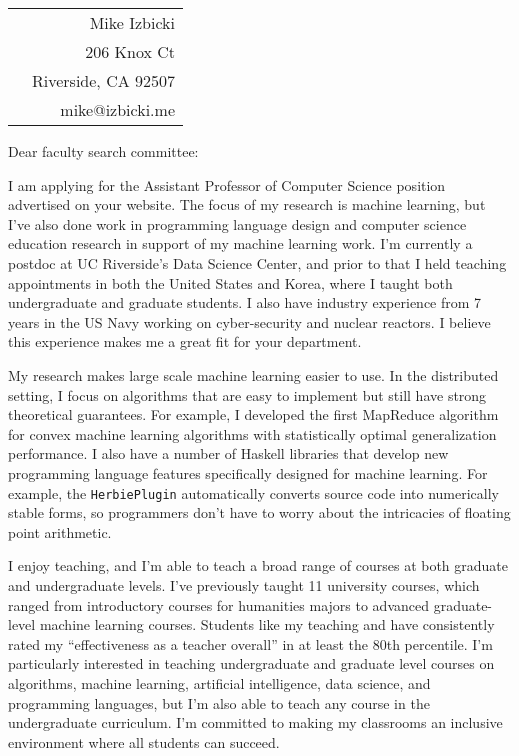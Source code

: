 \documentclass[12pt]{article}
\begin{document}
\noindent
\hspace{-0.13in}
\begin{tabularx}{1.03\textwidth}{Xr}
 & Mike Izbicki \\
 & 206 Knox Ct\\
 & Riverside, CA 92507\\
 & mike@izbicki.me\\
\end{tabularx}

\vspace{0.2in}

\setlength{\parskip}{15pt plus4mm minus3mm}

\noindent
Dear faculty search committee:

\noindent
I am applying for the Assistant Professor of Computer Science position advertised on your website.
The focus of my research is machine learning,
but I've also done work in programming language design and computer science education research in support of my machine learning work.
I'm currently a postdoc at UC Riverside's Data Science Center,
and prior to that I held teaching appointments in both the United States and Korea, where I taught both undergraduate and graduate students.
I also have industry experience from 7 years in the US Navy working on cyber-security and nuclear reactors.
I believe this experience makes me a great fit for your department.

\noindent
My research makes large scale machine learning easier to use.
In the distributed setting, I focus on algorithms that are easy to implement but still have strong theoretical guarantees.
For example, I developed the first MapReduce algorithm for convex machine learning algorithms with statistically optimal generalization performance.
I also have a number of Haskell libraries that develop new programming language features specifically designed for machine learning.
For example, the \texttt{HerbiePlugin} automatically converts source code into numerically stable forms,
so programmers don't have to worry about the intricacies of floating point arithmetic.

\noindent
I enjoy teaching,
and I'm able to teach a broad range of courses at both graduate and undergraduate levels.
I've previously taught 11 university courses,
which ranged from introductory courses for humanities majors to advanced graduate-level machine learning courses.
Students like my teaching and have consistently rated my ``effectiveness as a teacher overall'' in at least the 80th percentile.
I'm particularly interested in teaching undergraduate and graduate level courses on algorithms, machine learning, artificial intelligence, data science, and programming languages,
but I'm also able to teach any course in the undergraduate curriculum.
I'm committed to making my classrooms an inclusive environment where all students can succeed.
\end{document}
